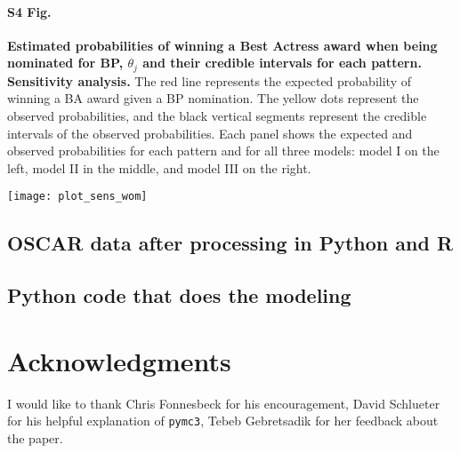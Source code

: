 \documentclass[10pt,letterpaper]{article}
\begin{document}
{\paragraph*{S4 Fig.}
\label{S4_Fig}
{\bf Estimated probabilities of winning a Best Actress award when being nominated for BP, $\theta_j$ and their credible intervals for each pattern. Sensitivity analysis.} The red line represents the expected probability of winning a BA award given a BP nomination. The yellow dots represent the observed probabilities, and the black vertical segments represent the credible intervals of the observed probabilities. Each panel shows the expected and observed probabilities for each pattern and for all three models: model I on the left, model II in the middle, and model III on the right.

\texttt{[image: plot\_sens\_wom]}
}

%

\subsection*{OSCAR data after processing in Python and R}
\subsection*{Python code that does the modeling}

\section*{Acknowledgments}
I would like to thank Chris Fonnesbeck for his encouragement, David Schlueter for his helpful explanation of \texttt{pymc3}, Tebeb Gebretsadik for her feedback about the paper.
\end{document}
